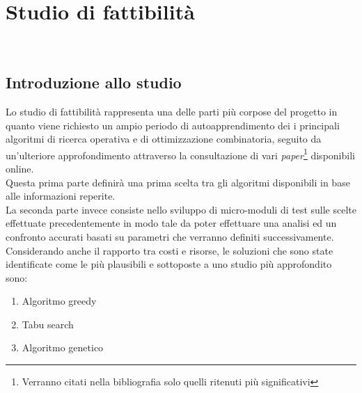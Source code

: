 
\chapter{Studio di fattibilità}
\label{cap:studio-fattibilita}

\noindent {}\\

\section{Introduzione allo studio}
\noindent Lo studio di fattibilità rappresenta una delle parti più corpose
del progetto in quanto viene richiesto un ampio periodo di autoapprendimento
dei i principali algoritmi di ricerca operativa e di ottimizzazione combinatoria,
seguito da un'ulteriore approfondimento attraverso la consultazione di vari \textit{paper}\footnote[2]{Verranno citati nella bibliografia solo quelli ritenuti più significativi}
disponibili online.\\

\noindent Questa prima parte definirà una prima scelta tra gli algoritmi disponibili in base alle informazioni reperite.\\

\noindent La seconda parte invece consiste nello sviluppo di micro-moduli di test sulle scelte effettuate
precedentemente in modo tale da poter effettuare una analisi ed un confronto accurati basati su parametri che verranno
definiti successivamente.\\

\noindent Considerando anche il rapporto tra costi e risorse, le soluzioni che sono state identificate come le più plausibili e sottoposte a uno studio più approfondito sono:
\begin{enumerate}
    \item Algoritmo greedy
    \item Tabu search
    \item Algoritmo genetico
\end{enumerate}

